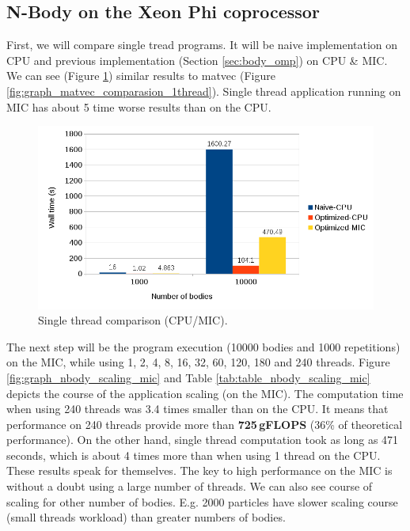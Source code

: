 \subsection{N-Body on the Xeon Phi coprocessor}
First, we will compare single tread programs. It will be naive implementation on CPU and previous implementation (Section \ref{sec:body_omp}) on CPU \& MIC. We can see (Figure \ref{fig:graph_nbody_1thread}) similar results to matvec (Figure \ref{fig:graph_matvec_comparasion_1thread}). Single thread application running on MIC has about 5 time worse results than on the CPU.

\begin{figure}[htbp]
    \centering
    \includegraphics[width=1\linewidth]{fig/nbody_compare_1thread.png}
    \caption{Single thread comparison (CPU/MIC).}
    \label{fig:graph_nbody_1thread}
\end{figure} 

\par The next step will be the program execution (10000 bodies and 1000 repetitions) on the MIC, while using 1, 2, 4, 8, 16, 32, 60, 120, 180 and 240 threads. Figure \ref{fig:graph_nbody_scaling_mic} and Table \ref{tab:table_nbody_scaling_mic} depicts the course of the application scaling (on the MIC). The computation time when using 240 threads was 3.4 times smaller than on the CPU. It means that performance on 240 threads provide more than \textbf{725\,gFLOPS} (36\% of theoretical performance). On the other hand, single thread computation took as long as 471 seconds, which is about 4 times more than when using 1 thread on the CPU. These results speak for themselves. The key to high performance on the MIC is without a doubt using a large number of threads. We can also see course of scaling for other number of bodies. E.g. 2000 particles have slower scaling course (small threads workload) than greater numbers of bodies. 

